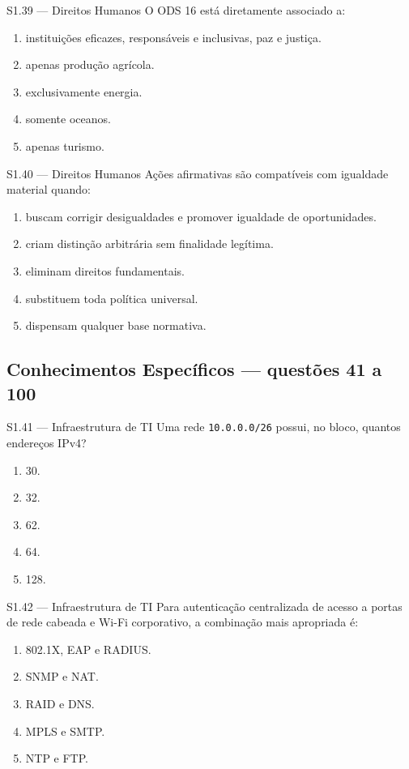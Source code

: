 \begin{questao}{S1.39 — Direitos Humanos}
O ODS 16 está diretamente associado a:
\begin{enumerate}[label=\Alph*)]
\item instituições eficazes, responsáveis e inclusivas, paz e justiça.
\item apenas produção agrícola.
\item exclusivamente energia.
\item somente oceanos.
\item apenas turismo.
\end{enumerate}
\end{questao}

\begin{questao}{S1.40 — Direitos Humanos}
Ações afirmativas são compatíveis com igualdade material quando:
\begin{enumerate}[label=\Alph*)]
\item buscam corrigir desigualdades e promover igualdade de oportunidades.
\item criam distinção arbitrária sem finalidade legítima.
\item eliminam direitos fundamentais.
\item substituem toda política universal.
\item dispensam qualquer base normativa.
\end{enumerate}
\end{questao}

\subsection*{Conhecimentos Específicos — questões 41 a 100}

\begin{questao}{S1.41 — Infraestrutura de TI}
Uma rede \texttt{10.0.0.0/26} possui, no bloco, quantos endereços IPv4?
\begin{enumerate}[label=\Alph*)]\item 30.\item 32.\item 62.\item 64.\item 128.\end{enumerate}
\end{questao}

\begin{questao}{S1.42 — Infraestrutura de TI}
Para autenticação centralizada de acesso a portas de rede cabeada e Wi-Fi corporativo, a combinação mais apropriada é:
\begin{enumerate}[label=\Alph*)]\item 802.1X, EAP e RADIUS.\item SNMP e NAT.\item RAID e DNS.\item MPLS e SMTP.\item NTP e FTP.\end{enumerate}
\end{questao}

